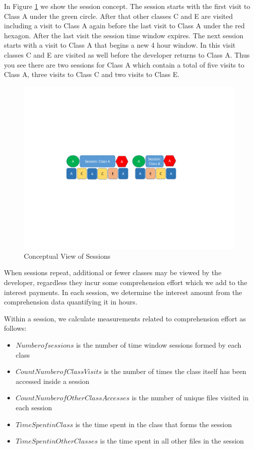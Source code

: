 In Figure \ref{fig:SessionDataConcept} we show the session concept.  The session starts with the first visit to Class A under the green circle.  After that other classes C and E are visited including a visit to Class A again before the last visit to Class A under the red hexagon.  After the last visit the session time window expires.  The next session starts with a visit to Class A that begins a new 4 hour window.  In this visit classes C and E are visited as well before the developer returns to Class A.  Thus you see there are two sessions for Class A which contain a total of five visits to Class A, three visits to Class C and two visits to Class E.
\begin{figure}
	\centering
	\includegraphics[width=\linewidth]{SessionDataConcept.pdf}
	\caption{Conceptual View of Sessions}
	\label{fig:SessionDataConcept}
\end{figure}

When sessions repeat, additional or fewer classes may be viewed by the developer, regardless they incur some comprehension effort which we add to the interest payments.  In each session, we determine the interest amount from the comprehension data quantifying it in hours. 


Within a session, we calculate measurements related to comprehension effort as follows:
\begin{itemize}
	\item[] $Number of sessions$ is the number of time window sessions formed by each class 
	\item[] $Count Number of Class Visits$ is the number of times the class itself has been accessed inside a session 
	\item[] $Count Number of Other Class Accesses$ is the number of unique files visited in each session
	\item[] $Time Spent in Class$ is the time spent in the class that forms the session
	\item[] $Time Spent in Other Classes$ is the time spent in all other files in the session
\end{itemize}

